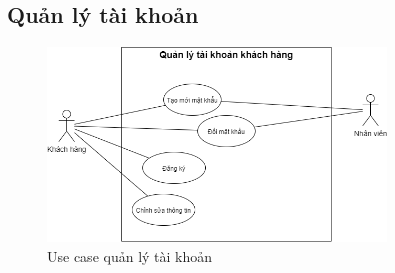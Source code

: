 \subsection{Quản lý tài khoản}
\begin{figure}[!htp]
    \centering
    \includegraphics[width=9cm]{img/UseCase/UseCase-Quản lý tài khoản.drawio.png}
    \newline
    \caption{Use case quản lý tài khoản}
\end{figure}


